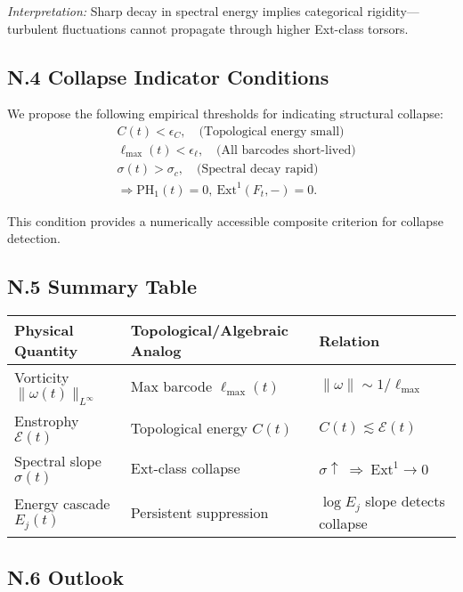 \documentclass[11pt]{article}
\theoremstyle{definition}
\begin{document}
\textit{Interpretation:} Sharp decay in spectral energy implies categorical rigidity—turbulent fluctuations cannot propagate through higher Ext-class torsors.

\subsection*{N.4 Collapse Indicator Conditions}

We propose the following empirical thresholds for indicating structural collapse:
\[
\begin{aligned}
& C(t) < \epsilon_C, \quad \text{(Topological energy small)} \\
& \ell_{\max}(t) < \epsilon_\ell, \quad \text{(All barcodes short-lived)} \\
& \sigma(t) > \sigma_c, \quad \text{(Spectral decay rapid)} \\
& \Rightarrow \mathrm{PH}_1(t) = 0,\ \mathrm{Ext}^1(F_t, -) = 0.
\end{aligned}
\]

This condition provides a numerically accessible composite criterion for collapse detection.

\subsection*{N.5 Summary Table}

\begin{center}
\renewcommand{\arraystretch}{1.3}
\begin{tabular}{|l|l|l|}
\hline
\textbf{Physical Quantity} & \textbf{Topological/Algebraic Analog} & \textbf{Relation} \\
\hline
Vorticity \( \|\omega(t)\|_{L^\infty} \) & Max barcode \( \ell_{\max}(t) \) & \( \|\omega\| \sim 1/\ell_{\max} \) \\
Enstrophy \( \mathcal{E}(t) \) & Topological energy \( C(t) \) & \( C(t) \lesssim \mathcal{E}(t) \) \\
Spectral slope \( \sigma(t) \) & Ext-class collapse & \( \sigma \uparrow \ \Rightarrow \ \mathrm{Ext}^1 \to 0 \) \\
Energy cascade \( E_j(t) \) & Persistent suppression & \( \log E_j \) slope detects collapse \\
\hline
\end{tabular}
\end{center}

\subsection*{N.6 Outlook}
\end{document}
